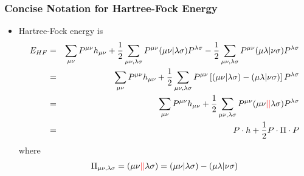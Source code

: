 \documentclass[handout]{beamer} %
\begin{document}
\begin{frame}
\frametitle{Concise Notation for Hartree-Fock Energy}
\begin{itemize}
\item \footnotesize{Hartree-Fock energy is}
\begin{eqnarray*}
E_{HF} & = &  \sum_{\mu \nu}   P^{\mu \nu}  h_{\mu\nu} + \frac{1}{2} \sum_{\mu \nu, \lambda \sigma} P^{\mu \nu}  ( \mu \nu | \lambda \sigma ) P^{\lambda \sigma}   
- \frac{1}{2} \sum_{\mu \nu, \lambda \sigma} P^{\mu \nu}  ( \mu \lambda | \nu \sigma ) P^{\lambda \sigma}   \\
& = &  \sum_{\mu \nu}   P^{\mu \nu}  h_{\mu\nu} + \frac{1}{2} \sum_{\mu \nu, \lambda \sigma} P^{\mu \nu}  \left[ ( \mu \nu | \lambda \sigma ) -  ( \mu \lambda | \nu \sigma ) \right] P^{\lambda \sigma}  \\
& = & \sum_{\mu \nu}   P^{\mu \nu}  h_{\mu\nu} + \frac{1}{2} \sum_{\mu \nu, \lambda \sigma} P^{\mu \nu} ( \mu \nu \textcolor{red}{||} \lambda \sigma ) P^{\lambda \sigma}   \\
& = & P \cdot h + \frac{1}{2} P \cdot \Pi \cdot P 
\end{eqnarray*}
where
\begin{eqnarray*}
\Pi_{\mu \nu, \lambda \sigma} =  ( \mu \nu \textcolor{red}{||} \lambda \sigma )  = ( \mu \nu | \lambda \sigma ) -  ( \mu \lambda | \nu \sigma ) 
\end{eqnarray*} 
\end{itemize}
\end{frame}
\end{document}
